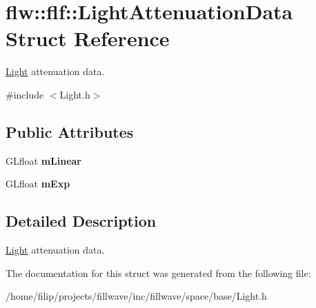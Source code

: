 \hypertarget{structflw_1_1flf_1_1LightAttenuationData}{}\section{flw\+:\+:flf\+:\+:Light\+Attenuation\+Data Struct Reference}
\label{structflw_1_1flf_1_1LightAttenuationData}


\hyperlink{classflw_1_1flf_1_1Light}{Light} attenuation data.  




{\ttfamily \#include $<$Light.\+h$>$}

\subsection*{Public Attributes}
\begin{DoxyCompactItemize}
\item 
\mbox{\label{structflw_1_1flf_1_1LightAttenuationData_af36466eb7114528901c5e29268e1a771}} 
G\+Lfloat {\bfseries m\+Linear}
\item 
\mbox{\label{structflw_1_1flf_1_1LightAttenuationData_ac30bbb96fe369514c57d71b282b51708}} 
G\+Lfloat {\bfseries m\+Exp}
\end{DoxyCompactItemize}


\subsection{Detailed Description}
\hyperlink{classflw_1_1flf_1_1Light}{Light} attenuation data. 

The documentation for this struct was generated from the following file\+:\begin{DoxyCompactItemize}
\item 
/home/filip/projects/fillwave/inc/fillwave/space/base/Light.\+h\end{DoxyCompactItemize}
